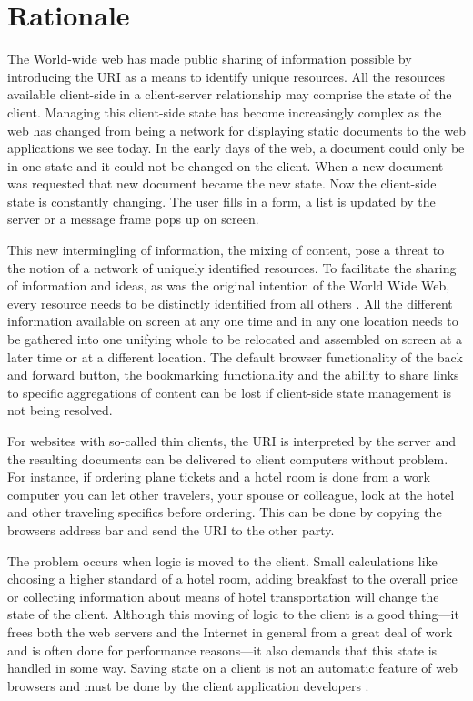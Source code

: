\documentclass[english]{ifimaster}
\begin{document}
\section{Rationale}
The World-wide web has made public sharing of information possible by introducing the URI as a means to identify unique resources. All the resources available client-side in a client-server relationship may comprise the state of the client. Managing this client-side state has become increasingly complex as the web has changed from being a network for displaying static documents to the web applications we see today. In the early days of the web, a document could only be in one state and it could not be changed on the client. When a new document was requested that new document became the new state. Now the client-side state is constantly changing. The user fills in a form, a list is updated by the server or a message frame pops up on screen. %

This new intermingling of information, the mixing of content, pose a threat to the notion of a network of uniquely identified resources. To facilitate the sharing of information and ideas, as was the original intention of the World Wide Web, every resource needs to be distinctly identified from all others \parencite{rfc_URI}. All the different information available on screen at any one time and in any one location needs to be gathered into one unifying whole to be relocated and assembled on screen at a later time or at a different location. The default browser functionality of the back and forward button, the bookmarking functionality and the ability to share links to specific aggregations of content can be lost if client-side state management is not being resolved. 

For websites with so-called thin clients, the URI is interpreted by the server and the resulting documents can be delivered to client computers without problem. For instance, if ordering plane tickets and a hotel room is done from a work computer you can let other travelers, your spouse or colleague, look at the hotel and other traveling specifics before ordering. This can be done by copying the browsers address bar and send the URI to the other party. 

The problem occurs when logic is moved to the client. Small calculations like choosing a higher standard of a hotel room, adding breakfast to the overall price or collecting information about means of hotel transportation will change the state of the client. Although this moving of logic to the client is a good thing---it frees both the web servers and the Internet in general from a great deal of work and is often done for performance reasons---it also demands that this state is handled in some way. Saving state on a client is not an automatic feature of web browsers and must be done by the client application developers \parencite{castro}. 
\end{document}
